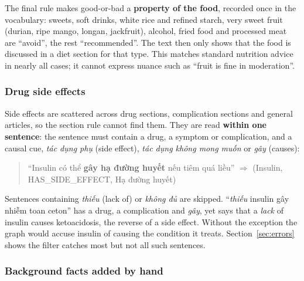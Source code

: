 \documentclass[11pt, a4paper]{article}
\begin{document}
The final rule makes good-or-bad a \textbf{property of the food}, recorded once in the vocabulary: sweets, soft drinks, white rice and refined starch, very sweet fruit (durian, ripe mango, longan, jackfruit), alcohol, fried food and processed meat are ``avoid'', the rest ``recommended''. The text then only shows that the food is discussed in a diet section for that type. This matches standard nutrition advice in nearly all cases; it cannot express nuance such as ``fruit is fine in moderation''.

\subsubsection{Drug side effects}

Side effects are scattered across drug sections, complication sections and general articles, so the section rule cannot find them. They are read \textbf{within one sentence}: the sentence must contain a drug, a symptom or complication, and a causal cue, \emph{tác dụng phụ} (side effect), \emph{tác dụng không mong muốn} or \emph{gây} (causes):

\begin{quote}\small
``Insulin có thể \textbf{gây hạ đường huyết} nếu tiêm quá liều'' $\Rightarrow$ (Insulin, HAS\_SIDE\_EFFECT, Hạ đường huyết)
\end{quote}

Sentences containing \emph{thiếu} (lack of) or \emph{không đủ} are skipped. ``\emph{thiếu} insulin gây nhiễm toan ceton'' has a drug, a complication and \emph{gây}, yet says that a \emph{lack} of insulin causes ketoacidosis, the reverse of a side effect. Without the exception the graph would accuse insulin of causing the condition it treats. Section~\ref{sec:errors} shows the filter catches most but not all such sentences.

\subsubsection{Background facts added by hand}
\label{sec:curated}
\end{document}
